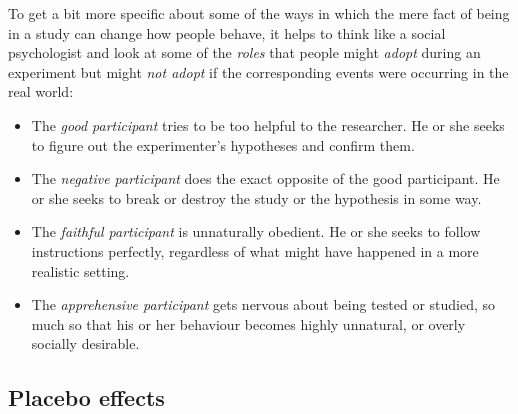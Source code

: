 

To get a bit more specific about some of the ways in which the mere fact of being in a study can change how people behave, it helps to think like a social psychologist and look at some of the {\it roles} that people might {\it adopt} during an experiment but might {\it not adopt} if the corresponding events were occurring in the real world:
\begin{itemize}
\item The {\it good participant} tries to be too helpful to the researcher. He or she seeks to figure out the experimenter's hypotheses and confirm them.
\item The {\it negative participant} does the exact opposite of the good participant. He or she seeks to break or destroy the study or the hypothesis in some way.
\item The {\it faithful participant} is unnaturally obedient. He or she seeks to follow instructions perfectly, regardless of what might have happened in a more realistic setting.
\item The {\it apprehensive participant} gets nervous about being tested or studied, so much so that his or her behaviour becomes highly unnatural, or overly socially desirable.
\end{itemize}


\subsection{Placebo effects}

